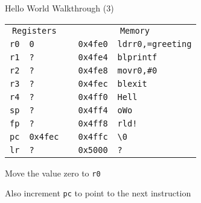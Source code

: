 \begin{frame}{Hello World Walkthrough (3)}
	\begin{alltt}
		\begin{tabular}{ r | l p{5mm} r | l }
			\multicolumn{2}{c}{Registers} &        & \multicolumn{2}{c}{Memory}                              \\
			r0                            & 0      &                            & 0x4fe0 & ldr r0, =greeting \\
			r1                            & ?      &                            & 0x4fe4 & bl printf         \\
			r2                            & ?      &                            & 0x4fe8 & mov r0, \#0       \\
			r3                            & ?      &                            & 0x4fec & bl exit           \\
			r4                            & ?      &                            & 0x4ff0 & Hell              \\
			sp                            & ?      &                            & 0x4ff4 & o Wo              \\
			fp                            & ?      &                            & 0x4ff8 & rld!              \\
			pc                            & 0x4fec &                            & 0x4ffc & {\textbackslash}0 \\
			lr                            & ?      &                            & 0x5000 & ?                 \\
		\end{tabular}
	\end{alltt}

	Move the value zero to \texttt{r0}

	Also increment \texttt{pc} to point to the next instruction


\end{frame}

